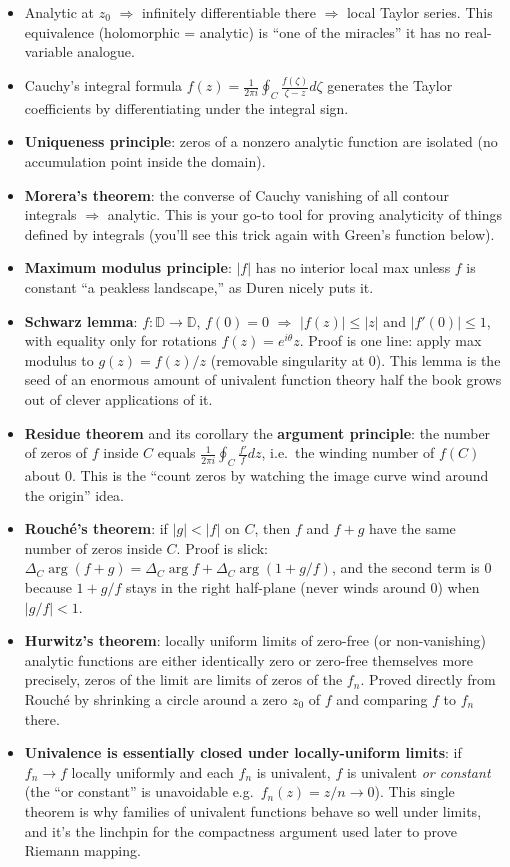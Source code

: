 \documentclass[
]{book}
\providecommand{\tightlist}{%
  \setlength{\itemsep}{0pt}\setlength{\parskip}{0pt}}
\theoremstyle{definition}
\theoremstyle{definition}
\theoremstyle{definition}
\theoremstyle{definition}
\theoremstyle{remark}
\begin{document}
\begin{itemize}
\tightlist
\item
  Analytic at \(z_0\) \(\Rightarrow\) infinitely differentiable there \(\Rightarrow\) local Taylor series. This equivalence (holomorphic = analytic) is ``one of the miracles'' it has no real-variable analogue.
\item
  Cauchy's integral formula \(f(z) = \frac{1}{2\pi i}\oint_C \frac{f(\zeta)}{\zeta - z}d\zeta\) generates the Taylor coefficients by differentiating under the integral sign.
\item
  \textbf{Uniqueness principle}: zeros of a nonzero analytic function are isolated (no accumulation point inside the domain).
\item
  \textbf{Morera's theorem}: the converse of Cauchy vanishing of all contour integrals \(\Rightarrow\) analytic. This is your go-to tool for proving analyticity of things defined by integrals (you'll see this trick again with Green's function below).
\item
  \textbf{Maximum modulus principle}: \(|f|\) has no interior local max unless \(f\) is constant ``a peakless landscape,'' as Duren nicely puts it.
\item
  \textbf{Schwarz lemma}: \(f:\mathbb{D}\to\mathbb{D}\), \(f(0)=0\) \(\Rightarrow\) \(|f(z)|\le |z|\) and \(|f'(0)|\le 1\), with equality only for rotations \(f(z)=e^{i\theta}z\). Proof is one line: apply max modulus to \(g(z) = f(z)/z\) (removable singularity at 0). This lemma is the seed of an enormous amount of univalent function theory half the book grows out of clever applications of it.
\item
  \textbf{Residue theorem} and its corollary the \textbf{argument principle}: the number of zeros of \(f\) inside \(C\) equals \(\frac{1}{2\pi i}\oint_C \frac{f'}{f}dz\), i.e.~the winding number of \(f(C)\) about \(0\). This is the ``count zeros by watching the image curve wind around the origin'' idea.
\item
  \textbf{Rouché's theorem}: if \(|g|<|f|\) on \(C\), then \(f\) and \(f+g\) have the same number of zeros inside \(C\). Proof is slick: \(\Delta_C \arg(f+g) = \Delta_C\arg f + \Delta_C \arg(1+g/f)\), and the second term is \(0\) because \(1+g/f\) stays in the right half-plane (never winds around 0) when \(|g/f|<1\).
\item
  \textbf{Hurwitz's theorem}: locally uniform limits of zero-free (or non-vanishing) analytic functions are either identically zero or zero-free themselves more precisely, zeros of the limit are limits of zeros of the \(f_n\). Proved directly from Rouché by shrinking a circle around a zero \(z_0\) of \(f\) and comparing \(f\) to \(f_n\) there.
\item
  \textbf{Univalence is essentially closed under locally-uniform limits}: if \(f_n\to f\) locally uniformly and each \(f_n\) is univalent, \(f\) is univalent \emph{or constant} (the ``or constant'' is unavoidable e.g.~\(f_n(z) = z/n \to 0\)). This single theorem is why families of univalent functions behave so well under limits, and it's the linchpin for the compactness argument used later to prove Riemann mapping.
\end{itemize}
\end{document}
